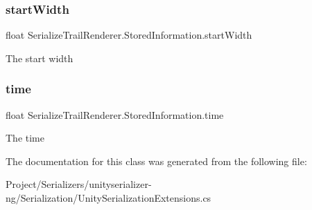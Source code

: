 \subsubsection{\texorpdfstring{start\+Width}{startWidth}}
{\footnotesize\ttfamily float Serialize\+Trail\+Renderer.\+Stored\+Information.\+start\+Width}



The start width 

\mbox{\label{class_serialize_trail_renderer_1_1_stored_information_a1f83c23bd946bef81b12cd1d46faed05}} 
\subsubsection{\texorpdfstring{time}{time}}
{\footnotesize\ttfamily float Serialize\+Trail\+Renderer.\+Stored\+Information.\+time}



The time 



The documentation for this class was generated from the following file\+:\begin{DoxyCompactItemize}
\item 
Project/\+Serializers/unityserializer-\/ng/\+Serialization/Unity\+Serialization\+Extensions.\+cs\end{DoxyCompactItemize}
